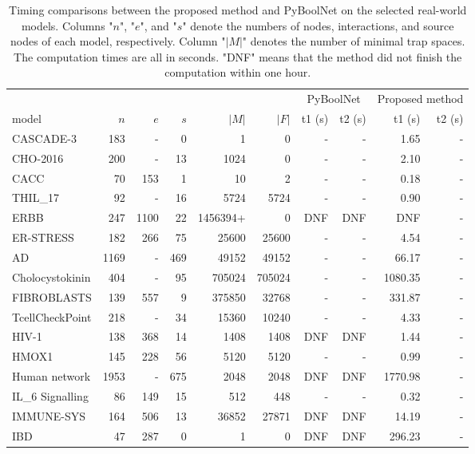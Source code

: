 \documentclass[runningheads]{llncs}
\begin{document}
\begin{table}[!ht]
  \caption{Timing comparisons between the proposed method and PyBoolNet on the selected real-world models.
    Columns "\(n\)", "\(e\)", and "\(s\)" denote the numbers of nodes, interactions, and source nodes of each model, respectively.
    Column "\(|M|\)" denotes the number of minimal trap spaces.
    The computation times are all in seconds.
    "DNF" means that the method did not finish the computation within one hour.}
  \label{tab:result_real}
  \begin{tabular}{lrrrrrrrrr}
    \toprule
    & & & & & & \multicolumn{2}{c}{PyBoolNet} & \multicolumn{2}{c}{Proposed method}\\
    \cmidrule(lr){7-8}\cmidrule(lr){9-10}
    model & $n$ & $e$ & $s$ & $|M|$ & $|F|$ & t1 (s) & t2 (s) & t1 (s) & t2 (s) \\ \midrule
    CASCADE-3 & 183 & - & 0 & 1 & 0 & - & - & 1.65 & - \\
    CHO-2016 & 200 & - & 13 & 1024 & 0 & - & - & 2.10 & - \\
    CACC & 70 & 153 & 1 & 10 & 2 & - & - & 0.18 & - \\
    THIL\_17 & 92 & - & 16 & 5724 & 5724 & - & - & 0.90 & - \\
    ERBB & 247 & 1100 & 22 & 1456394+ & 0 & DNF & DNF & DNF & - \\
    ER-STRESS & 182 & 266 & 75 & 25600 & 25600 & - & - & 4.54 & - \\
    AD & 1169 & - & 469 & 49152 & 49152 & - & - & 66.17 & - \\
    Cholocystokinin & 404 & - & 95 & 705024 & 705024 & - & - & 1080.35 & - \\
    FIBROBLASTS & 139 & 557 & 9 & 375850 & 32768 & - & - & 331.87 & - \\
    TcellCheckPoint & 218 & - & 34 & 15360 & 10240 & - & - & 4.33 & - \\
    HIV-1 & 138 & 368 & 14 & 1408 & 1408 & DNF & DNF & 1.44 & - \\
    HMOX1 & 145 & 228 & 56 & 5120 & 5120 & - & - & 0.99 & - \\
    Human network & 1953 & - & 675 & 2048 & 2048 & DNF & DNF & 1770.98 & - \\
    IL\_6 Signalling & 86 & 149 & 15 & 512 & 448 & - & - & 0.32 & - \\
    IMMUNE-SYS & 164 & 506 & 13 & 36852 & 27871 & DNF & DNF & 14.19 & - \\
    IBD & 47 & 287 & 0 & 1 & 0 & DNF & DNF & 296.23 & - \\

\end{tabular}
\end{table}
\end{document}
